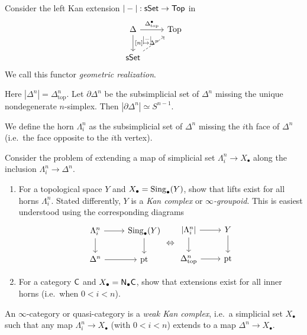 \documentclass{amsart}
\begin{document}
\begin{cons}
	Consider the left Kan extension $|-|: \mathsf{sSet} \to \mathsf{Top}$ in
	\[
		\begin{tikzcd}
			\Delta \arrow[r, "\Delta^\bullet_{\mathrm{top}}"] \arrow[d, "{[n]} \mapsto \Delta^n"] & \mathrm{Top} \\
	\sSet \arrow[ur, dashed, "|-|"]
		\end{tikzcd}
	\]
	We call this functor \emph{geometric realization}.
\end{cons}

\begin{ex}
	Here $|\Delta^n| = \Delta^n_{\mathrm{top}}$.
	Let $\partial \Delta^n$ be the subsimplicial set of $\Delta^n$ missing the unique nondegenerate $n$-simplex.
	Then $|\partial \Delta^n| \simeq S^{n-1}$.
\end{ex}

We define the horn $\Lambda_i^n$ as the subsimplicial set of $\Delta^n$ missing the $i$th face of $\Delta^n$ (i.e.\ the face opposite to the $i$th vertex).

\begin{exer}
	Consider the problem of extending a map of simplicial set $\Lambda_i^n \to X_\bullet$ along the inclusion $\Lambda_i^n \to \Delta^n$.
	\begin{enumerate}
		\item For a topological space $Y$ and $X_\bullet = \operatorname{Sing}_\bullet(Y)$, show that lifts exist for all horns $\Lambda_i^n$.
		Stated differently, $Y$ is a \emph{Kan complex} or \emph{$\infty$-groupoid}.
		This is easiest understood using the corresponding diagrams
		\[
			\begin{tikzcd}
				\Lambda^n_i \rar \dar & \Sing_\bullet(Y) \dar \\
				\Delta^n \rar & \pt
			\end{tikzcd}
			\Leftrightarrow
			\begin{tikzcd}
				{|\Lambda^n_i|} \rar \dar & Y \dar \\
				\Delta^n_{\mathrm{top}} \rar & \pt
			\end{tikzcd}
		\]
		\item For a category $\mathsf{C}$ and $X_\bullet = \mathsf{N}_\bullet \mathsf{C}$, show that extensions exist for all inner horns (i.e.\ when $0 < i < n$).
	\end{enumerate}
\end{exer}

\begin{dfn}
	An $\infty$-category or quasi-category is a \emph{weak Kan complex}, i.e.\ a simplicial set $X_\bullet$ such that any map $\Lambda_i^n \to X_\bullet$ (with $0 < i < n$) extends to a map $\Delta^n \to X_\bullet$.
\end{dfn}
\end{document}
